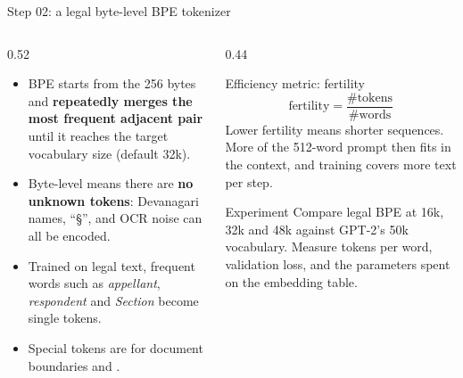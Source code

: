 \documentclass[aspectratio=169,11pt]{beamer}
\newcommand{\code}[1]{\texttt{\small #1}}
\begin{document}
\begin{frame}{Step 02: a legal byte-level BPE tokenizer}
  \begin{columns}[T]
    \begin{column}{0.52\textwidth}
      \small
      \begin{itemize}
        \item BPE starts from the 256 bytes and \textbf{repeatedly merges the most frequent adjacent pair} until it reaches the target vocabulary size (default 32k).
        \item Byte-level means there are \textbf{no unknown tokens}: Devanagari names, ``\S'', and OCR noise can all be encoded.
        \item Trained on legal text, frequent words such as \emph{appellant}, \emph{respondent} and \emph{Section} become single tokens.
        \item Special tokens are \code{<|endoftext|>} for document boundaries and \code{<|pad|>}.
      \end{itemize}
    \end{column}
    \begin{column}{0.44\textwidth}
      \begin{block}{Efficiency metric: fertility}
        \small
        \[
          \text{fertility}=\frac{\#\text{tokens}}{\#\text{words}}
        \]
        Lower fertility means shorter sequences. More of the 512-word prompt then fits in the context, and training covers more text per step.
      \end{block}
      \begin{exampleblock}{Experiment}
        \small
        Compare legal BPE at 16k, 32k and 48k against GPT-2's 50k vocabulary.
        Measure tokens per word, validation loss, and the parameters spent on the embedding table.
      \end{exampleblock}
    \end{column}
  \end{columns}
\end{frame}
\end{document}
